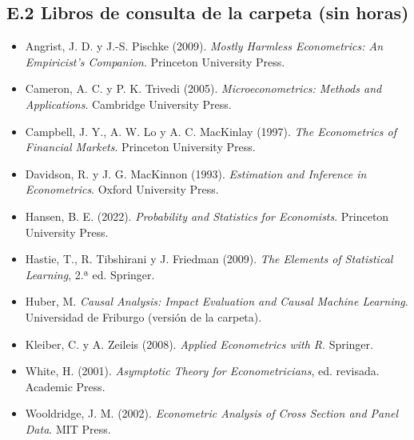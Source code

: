 \documentclass[11pt,a4paper]{article}
\begin{document}
\subsection*{E.2 Libros de consulta de la carpeta (sin horas)}
{\small
\begin{itemize}[leftmargin=1.4em,itemsep=1pt,label={}]
\item Angrist, J. D. y J.-S. Pischke (2009). \emph{Mostly Harmless Econometrics: An Empiricist's Companion}. Princeton University Press.
\item Cameron, A. C. y P. K. Trivedi (2005). \emph{Microeconometrics: Methods and Applications}. Cambridge University Press.
\item Campbell, J. Y., A. W. Lo y A. C. MacKinlay (1997). \emph{The Econometrics of Financial Markets}. Princeton University Press.
\item Davidson, R. y J. G. MacKinnon (1993). \emph{Estimation and Inference in Econometrics}. Oxford University Press.
\item Hansen, B. E. (2022). \emph{Probability and Statistics for Economists}. Princeton University Press.
\item Hastie, T., R. Tibshirani y J. Friedman (2009). \emph{The Elements of Statistical Learning}, 2.ª ed. Springer.
\item Huber, M. \emph{Causal Analysis: Impact Evaluation and Causal Machine Learning}. Universidad de Friburgo (versión de la carpeta).
\item Kleiber, C. y A. Zeileis (2008). \emph{Applied Econometrics with R}. Springer.
\item White, H. (2001). \emph{Asymptotic Theory for Econometricians}, ed. revisada. Academic Press.
\item Wooldridge, J. M. (2002). \emph{Econometric Analysis of Cross Section and Panel Data}. MIT Press.
\end{itemize}
}
\end{document}

